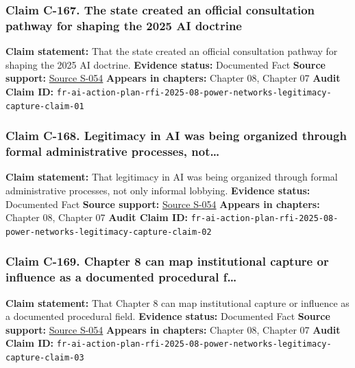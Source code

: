 \documentclass[
  american,
  11pt,
  letterpaper,
]{article}
\begin{document}
\subsubsection{Claim C-167. The state created an official consultation
pathway for shaping the 2025 AI
doctrine}\label{claim-c-167-the-state-created-an-official-consultation-pathway-for-shaping-the-2025-ai-doctrine}

\textbf{Claim statement:} That the state created an official
consultation pathway for shaping the 2025 AI doctrine. \textbf{Evidence
status:} Documented Fact \textbf{Source support:}
\hyperref[source-s-054-request-for-information-on-the-development-of-an-artificial-intelligence-ai-action-plan]{Source
S-054} \textbf{Appears in chapters:} Chapter 08, Chapter 07
\textbf{Audit Claim ID:}
\texttt{fr-ai-action-plan-rfi-2025-08-power-networks-legitimacy-capture-claim-01}

\subsubsection{Claim C-168. Legitimacy in AI was being organized through
formal administrative processes,
not\ldots{}}\label{claim-c-168-legitimacy-in-ai-was-being-organized-through-formal-administrative-processes-not}

\textbf{Claim statement:} That legitimacy in AI was being organized
through formal administrative processes, not only informal lobbying.
\textbf{Evidence status:} Documented Fact \textbf{Source support:}
\hyperref[source-s-054-request-for-information-on-the-development-of-an-artificial-intelligence-ai-action-plan]{Source
S-054} \textbf{Appears in chapters:} Chapter 08, Chapter 07
\textbf{Audit Claim ID:}
\texttt{fr-ai-action-plan-rfi-2025-08-power-networks-legitimacy-capture-claim-02}

\subsubsection{Claim C-169. Chapter 8 can map institutional capture or
influence as a documented procedural
f\ldots{}}\label{claim-c-169-chapter-8-can-map-institutional-capture-or-influence-as-a-documented-procedural-f}

\textbf{Claim statement:} That Chapter 8 can map institutional capture
or influence as a documented procedural field. \textbf{Evidence status:}
Documented Fact \textbf{Source support:}
\hyperref[source-s-054-request-for-information-on-the-development-of-an-artificial-intelligence-ai-action-plan]{Source
S-054} \textbf{Appears in chapters:} Chapter 08, Chapter 07
\textbf{Audit Claim ID:}
\texttt{fr-ai-action-plan-rfi-2025-08-power-networks-legitimacy-capture-claim-03}
\end{document}
